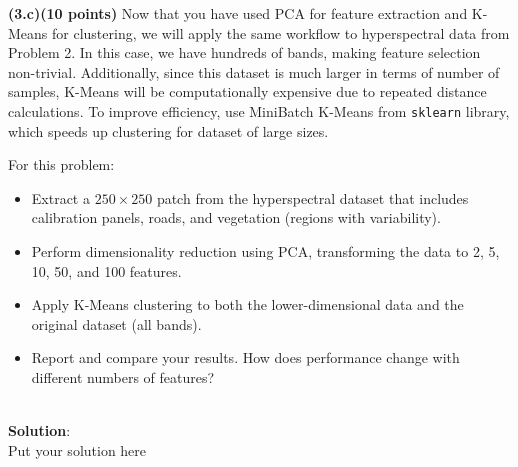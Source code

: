 \documentclass[12pt]{article}
\begin{document}
\noindent\textbf{(3.c)(10 points)} Now that you have used PCA for feature extraction and K-Means for clustering, we will apply the same workflow to hyperspectral data from Problem 2. In this case, we have hundreds of bands, making feature selection non-trivial. Additionally, since this dataset is much larger in terms of number of samples, K-Means will be computationally expensive due to repeated distance calculations. To improve efficiency, use MiniBatch K-Means from \texttt{sklearn} library, which speeds up clustering for dataset of large sizes.  

For this problem:
\begin{itemize}
    \item Extract a \(250 \times 250\) patch from the hyperspectral dataset that includes calibration panels, roads, and vegetation (regions with variability).  
    \item Perform dimensionality reduction using PCA, transforming the data to 2, 5, 10, 50, and 100 features.  
    \item Apply K-Means clustering to both the lower-dimensional data and the original dataset (all bands).  
    \item Report and compare your results. How does performance change with different numbers of features?  
\end{itemize}\\

\noindent\textbf{Solution}:\\
Put your solution here\\
\end{document}
